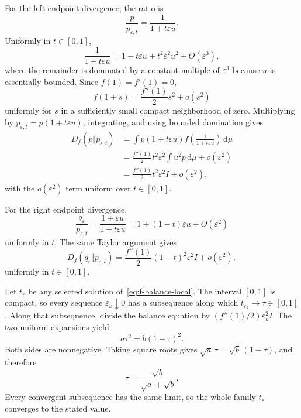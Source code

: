 \documentclass[runningheads]{llncs}
\newcommand{\dd}{\,\mathrm{d}}
\begin{document}
For the left endpoint divergence, the ratio is
\begin{equation*}
  \frac{p}{p_{\varepsilon,t}}=\frac{1}{1+t\varepsilon u}.
\end{equation*}
Uniformly in $t\in[0,1]$,
\begin{equation*}
  \frac{1}{1+t\varepsilon u}=1-t\varepsilon u+t^2\varepsilon^2u^2+O(\varepsilon^3),
\end{equation*}
where the remainder is dominated by a constant multiple of $\varepsilon^3$ because $u$ is essentially bounded. Since $f(1)=f'(1)=0$,
\begin{equation*}
  f(1+s)=\frac{f''(1)}{2}s^2+o(s^2)
\end{equation*}
uniformly for $s$ in a sufficiently small compact neighborhood of zero. Multiplying by $p_{\varepsilon,t}=p(1+t\varepsilon u)$, integrating, and using bounded domination gives
\begin{align*}
  D_f(p\Vert p_{\varepsilon,t})
  &=\int p(1+t\varepsilon u)
      f\!\left(\frac{1}{1+t\varepsilon u}\right)\dd\mu\\
  &=\frac{f''(1)}{2}t^2\varepsilon^2\int u^2p\dd\mu+o(\varepsilon^2)\\
  &=\frac{f''(1)}{2}t^2\varepsilon^2 I+o(\varepsilon^2),
\end{align*}
with the $o(\varepsilon^2)$ term uniform over $t\in[0,1]$.

For the right endpoint divergence,
\begin{equation*}
  \frac{q_\varepsilon}{p_{\varepsilon,t}}
  =\frac{1+\varepsilon u}{1+t\varepsilon u}
  =1+(1-t)\varepsilon u+O(\varepsilon^2)
\end{equation*}
uniformly in $t$. The same Taylor argument gives
\begin{equation*}
  D_f(q_\varepsilon\Vert p_{\varepsilon,t})
  =\frac{f''(1)}{2}(1-t)^2\varepsilon^2 I+o(\varepsilon^2),
\end{equation*}
uniformly in $t\in[0,1]$.

Let $t_\varepsilon$ be any selected solution of~\eqref{eq:f-balance-local}. The interval $[0,1]$ is compact, so every sequence $\varepsilon_k\downarrow0$ has a subsequence along which $t_{\varepsilon_k}\to\tau\in[0,1]$. Along that subsequence, divide the balance equation by $(f''(1)/2)\varepsilon_k^2I$. The two uniform expansions yield
\begin{equation*}
  a\tau^2=b(1-\tau)^2.
\end{equation*}
Both sides are nonnegative. Taking square roots gives $\sqrt a\,\tau=\sqrt b\,(1-\tau)$, and therefore
\begin{equation*}
  \tau=\frac{\sqrt b}{\sqrt a+\sqrt b}.
\end{equation*}
Every convergent subsequence has the same limit, so the whole family $t_\varepsilon$ converges to the stated value.
\end{document}
